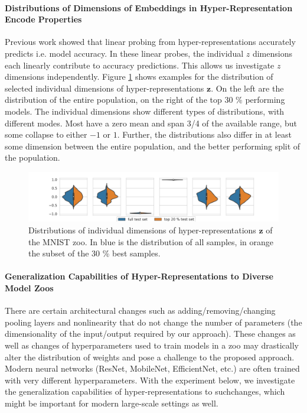 \paragraph{Distributions of Dimensions of Embeddings in Hyper-Representation Encode Properties}
Previous work showed that linear probing from hyper-representations accurately predicts i.e. model accuracy. 
In these linear probes, the individual $z$ dimensions each linearly contribute to accuracy predictions. 
This allows us investigate $z$ dimensions independently.
Figure \ref{fig:z_wise_distribution} shows examples for the distribution of selected individual dimensions of hyper-representations $\mathbf{z}$. On the left are the distribution of the entire population, on the right of the top 30 \% performing models.
The individual dimensions show different types of distributions, with different modes. Most have a zero mean and span 3/4 of the available range, but some collapse to either $-1$ or $1$. 
Further, the distributions also differ in at least some dimension between the entire population, and the better performing split of the population.
\begin{figure}[ht!]
\begin{minipage}[t]{0.99\textwidth}
\begin{center}
\includegraphics[trim=0mm 5.3mm 0mm 0mm, clip, width=1.0\linewidth]{figures/z_wise_distro_choice.png}
\vskip 0mm
\caption{Distributions of individual dimensions of hyper-representations $\mathbf{z}$ of the MNIST zoo. In {\color{cyan}blue} is the distribution of all samples, in {\color{orange}orange} the subset of the 30 \% best samples.}
\label{fig:z_wise_distribution}    
\end{center}
\end{minipage}
\end{figure}

\paragraph{Generalization Capabilities of Hyper-Representations to Diverse Model Zoos}
There are certain architectural changes such as adding/removing/changing pooling layers and nonlinearity that do not change the number of parameters (the dimensionality of the input/output required by our approach). These changes as well as changes of hyperparameters used to train models in a zoo may drastically alter the distribution of weights and pose a challenge to the proposed approach. Modern neural networks (ResNet, MobileNet, EfficientNet, etc.) are often trained with very different hyperparameters. With the experiment below, we investigate the generalization capabilities of hyper-representations to suchchanges, which might be important for modern large-scale settings as well.

